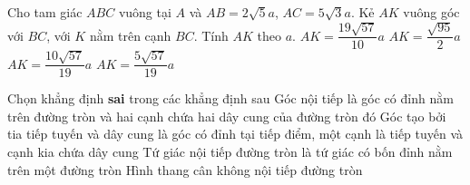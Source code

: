 \begin{ex}%
Cho tam giác $ABC$ vuông tại $A$ và $AB=2\sqrt{5}a$, $AC=5\sqrt{3}a$. Kẻ $AK$ vuông góc với $BC$, với $K$ nằm trên cạnh $BC$. Tính $AK$ theo $a$.
\choice
{$AK=\dfrac{19\sqrt{57}}{10}a$}
{$AK=\dfrac{\sqrt{95}}{2}a$}
{\True $AK=\dfrac{10\sqrt{57}}{19}a$}
{$AK=\dfrac{5\sqrt{57}}{19}a$}
\end{ex}

\begin{ex}%
Chọn khẳng định \textbf{sai} trong các khẳng định sau
\choice
{Góc nội tiếp là góc có đỉnh nằm trên đường tròn và hai cạnh chứa hai dây cung của đường tròn đó}
{Góc tạo bởi tia tiếp tuyến và dây cung là góc có đỉnh tại tiếp điểm, một cạnh là tiếp tuyến và cạnh kia chứa dây cung}
{Tứ giác nội tiếp đường tròn là tứ giác có bốn đỉnh nằm trên một đường tròn}
{\True Hình thang cân không nội tiếp đường tròn}
\end{ex}

